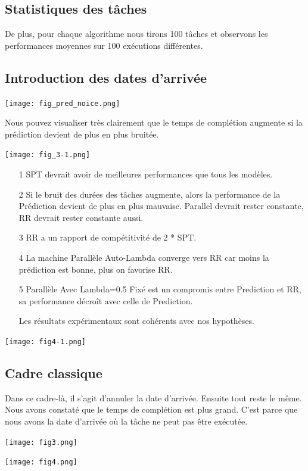 \documentclass[12pt]{article}
\begin{document}
    \subsection{Statistiques des tâches}
    
    \begin{figure}
        \centering
        \label{fig:foobar}
    \end{figure}

    

    De plus, pour chaque algorithme nous tirons 100 tâches et observons les performances moyennes sur 100 exécutions différentes.

    \subsection{Introduction des dates d'arrivée}
    
    \texttt{[image: fig\_pred\_noice.png]}
    
    Nous pouvez visualiser très clairement que le temps de complétion augmente si la prédiction devient de plus en plus bruitée.
    
        
    \texttt{[image: fig\_3-1.png]}
    
    
    \begin{itemize}
        \item[1] SPT devrait avoir de meilleures performances que tous les modèles.
        \item[2] Si le bruit des durées des tâches augmente, alors la performance de la Prédiction devient de plus en plus mauvaise. Parallel devrait rester constante, RR devrait rester constante aussi.
        \item[3] RR a un rapport de compétitivité de 2 * SPT.
        \item[4] La machine Parallèle Auto-Lambda converge vers RR car moins la prédiction est bonne, plus on favorise RR.
        \item[5] Parallèle Avec Lambda=0.5 Fixé est un compromis entre Prediction et RR, sa performance décroît avec celle de Prediction.
  
    
    Les résultats expérimentaux sont cohérents avec nos hypothèses.
    \end{itemize}
    
    \texttt{[image: fig4-1.png]}
    
    \subsection{Cadre classique}
    
    Dans ce cadre-là, il s'agit d'annuler la date d'arrivée. Ensuite tout reste le même. Nous avons constaté que le temps de complétion est plus grand. C'est parce que nous avons la date d'arrivée où la tâche ne peut pas être exécutée.
    
    \texttt{[image: fig3.png]}
    
    \texttt{[image: fig4.png]}
    
    
\end{document}
